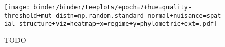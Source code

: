 \begin{figure*}
  \centering
  \texttt{[image: binder/binder/teeplots/epoch=7+hue=quality-threshold+mut\_distn=np.random.standard\_normal+nuisance=spatial-structure+viz=heatmap+x=regime+y=phylometric+ext=.pdf]}
  \caption{%
    TODO}
  \label{fig:reconstructed-tree-phylometrics-error-spatial-nuisance}
\end{figure*}
